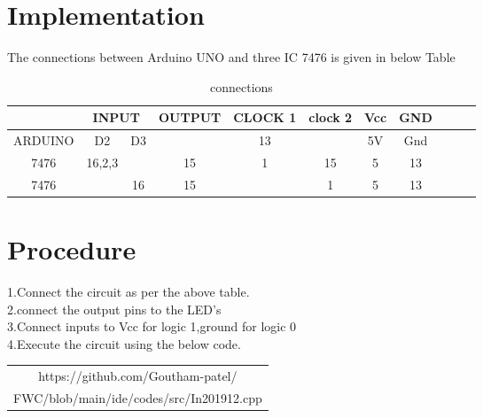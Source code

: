 \documentclass[journal,12pt]{article}
\begin{document}
\section{Implementation}
The connections between Arduino UNO and three IC 7476 is given in below Table \\
\begin{table}[h]
  \begin{center}
  \begin{tabular}{|c|c|c|c|c|c|c|c|c|c|c|}
    \hline & \multicolumn{2}{|c|}{INPUT} & OUTPUT & CLOCK 1 & clock 2 & Vcc & GND \\
    \hline ARDUINO & D2 & D3 &   &  13 &    & 5V & Gnd  \\
    \hline 7476 & \multicolumn{1}{|c|}{16,2,3} & \multicolumn{1}{|c|}{} & \multicolumn{1}{|c|}{15} & 1 & 15 & 5 & 13 \\
    \hline 7476 & \multicolumn{1}{|c|}{} & \multicolumn{1}{|c|}{16} &  15 &  & 1 & 5 & 13 \\
            \hline
  \end{tabular}
  \end{center}
  \caption{connections}
  \label{table:1}
\end{table}
\section{Procedure}
\begin{raggedright}
    1.Connect the circuit as per the above table.\\
    2.connect the output pins to the LED's \\
    3.Connect inputs to Vcc for logic 1,ground for logic 0 \\
    4.Execute the circuit using the below code.\\
\begin{table}[h]
\centering
  \begin{tabular}{|c|}
  \hline
   https://github.com/Goutham-patel/\\
	  FWC/blob/main/ide/codes/src/In201912.cpp\\
  \hline
\end{tabular}
\end{table}
\end{raggedright}

\end{document}
